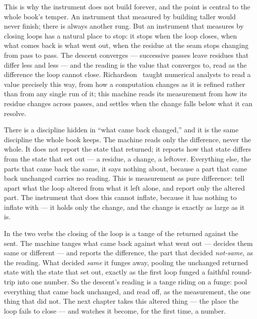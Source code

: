 This is why the instrument does not build forever, and the point is central to the whole book's temper. An instrument
that measured by building taller would never finish; there is always another rung. But an instrument that measures by
closing loops has a natural place to stop: it stops when the loop closes, when what comes back is what went out, when
the residue at the seam stops changing from pass to pass. The descent converges --- successive passes leave residues
that differ less and less --- and the reading is the value that converges to, read as the difference the loop cannot
close. Richardson~\cite{richardson1961} taught numerical analysts to read a value precisely this way, from how a
computation changes as it is refined rather than from any single run of it; this machine reads its measurement from how
its residue changes across passes, and settles when the change falls below what it can resolve.

There is a discipline hidden in ``what came back changed,'' and it is the same discipline the whole book keeps. The
machine reads only the difference, never the whole. It does not report the state that returned; it reports how that
state differs from the state that set out --- a residue, a change, a leftover. Everything else, the parts that came back
the same, it says nothing about, because a part that came back unchanged carries no reading. This is measurement as pure
difference: tell apart what the loop altered from what it left alone, and report only the altered part. The instrument
that does this cannot inflate, because it has nothing to inflate with --- it holds only the change, and the change is
exactly as large as it is.

In the two verbs the closing of the loop is a tange of the returned against the sent. The machine tanges what came back
against what went out --- decides them same or different --- and reports the difference, the part that decided
\emph{not-same}, as the reading. What decided \emph{same} it funges away, pooling the unchanged returned state with the
state that set out, exactly as the first loop funged a faithful round-trip into one number. So the descent's reading is
a tange riding on a funge: pool everything that came back unchanged, and read off, as the measurement, the one thing that
did not. The next chapter takes this altered thing --- the place the loop fails to close --- and watches it become, for
the first time, a number.
